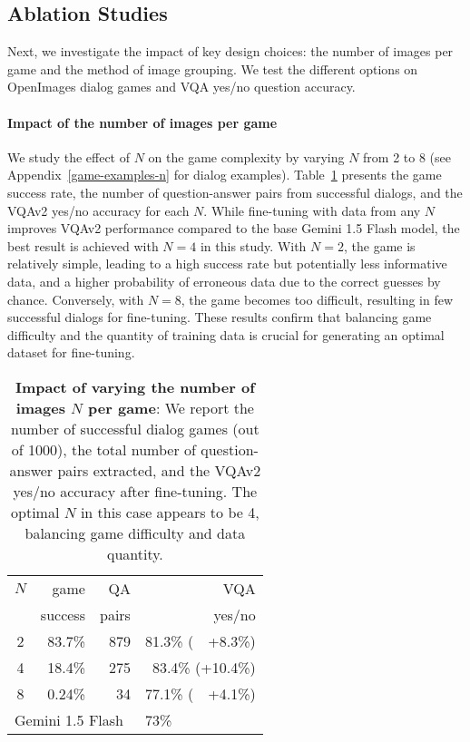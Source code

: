 \subsection{Ablation Studies}
\label{sec:exps-openimages-ablations}

Next, we investigate the impact of key design choices: the number of images per game and the method of image grouping.
We test the different options on OpenImages dialog games and VQA yes/no question accuracy.

\paragraph{Impact of the number of images per game}
We study the effect of $N$ on the game complexity by varying $N$ from \num{2} to \num{8} (see Appendix~\ref{game-examples-n} for dialog examples). Table~\ref{tab:openimage_n_images} presents the game success rate, the number of question-answer pairs from successful dialogs, and the VQAv2 yes/no accuracy for each $N$.
While fine-tuning with data from any $N$ improves VQAv2 performance compared to the base Gemini 1.5 Flash model, the best result is achieved with $N = 4$ in this study.
With $N = 2$, the game is relatively simple, leading to a high success rate but potentially less informative data, and a higher probability of erroneous data due to the correct guesses by chance.
Conversely, with $N = 8$, the game becomes too difficult, resulting in few successful dialogs for fine-tuning.
These results confirm that balancing game difficulty and the quantity of training data is crucial for generating an optimal dataset for fine-tuning.

\begin{table}[t]
    \centering
    \caption{\textbf{Impact of varying the number of images $N$ per game}: We report the number of successful dialog games (out of \num{1000}), the total number of question-answer pairs extracted, and the VQAv2 yes/no accuracy after fine-tuning. The optimal $N$ in this case appears to be \num{4}, balancing game difficulty and data quantity.}
    \vspace{5mm}
    \begin{tabular}{c|r|r|r}
      $N$ & game  & QA & VQA \\
       & success & pairs & yes/no \\
      \midrule
      2  & 83.7\% & 879 & 81.3\%  (~~+8.3\%) \\
      4  & 18.4\% & 275 & 83.4\% (+10.4\%) \\
      8  & 0.24\% & 34 & 77.1\%  (~~+4.1\%) \\
      \midrule
      \multicolumn{3}{l}{Gemini 1.5 Flash} & \multicolumn{1}{|l}{73\%} \\
    \end{tabular}
    \label{tab:openimage_n_images}
\end{table}

